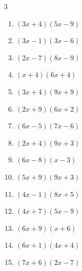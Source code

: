 \begin{multicols}{3}
\begin{enumerate}
  \item $(3x+4)(5x-9)$


  \item $(3x-1)(3x-6)$


  \item $(2x-7)(8x-9)$


  \item $(x+4)(6x+4)$


  \item $(3x+4)(9x+9)$


  \item $(2x+9)(6x+2)$


  \item $(6x-5)(7x-6)$


  \item $(2x+4)(9x+3)$


  \item $(6x-8)(x-3)$


  \item $(5x+9)(9x+3)$


  \item $(4x-1)(8x+5)$


\columnbreak %

  \item $(4x+7)(5x-9)$


  \item $(6x+9)(x+6)$


  \item $(6x+1)(4x+4)$


  \item $(7x+6)(2x-7)$


\end{enumerate}
\end{multicols}
